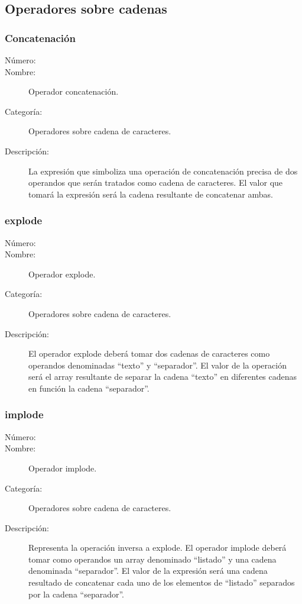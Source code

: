 \subsection{Operadores sobre cadenas}

\subsubsection{Concatenación}
\begin{framed}
	\begin{description}
		\item [Número:] \cn
		\item [Nombre:] Operador concatenación.
		\item [Categoría:] Operadores sobre cadena de caracteres.
		\item [Descripción:] La expresión que simboliza una operación de concatenación precisa de dos operandos que serán
		tratados como cadena de caracteres. El valor que tomará la expresión será la cadena resultante de concatenar ambas.
	\end {description}
\end{framed}

\subsubsection{explode}
\begin{framed}
	\begin{description}
		\item [Número:] \cn
		\item [Nombre:] Operador explode.
		\item [Categoría:] Operadores sobre cadena de caracteres.
		\item [Descripción:] El operador explode deberá tomar dos cadenas de caracteres como operandos denominadas ``texto'' y ``separador''.
		El valor de la operación será el array resultante de separar la cadena ``texto'' en diferentes cadenas en función la cadena ``separador''.
	\end {description}
\end{framed}

\subsubsection{implode}
\begin{framed}
	\begin{description}
		\item [Número:] \cn
		\item [Nombre:] Operador implode.
		\item [Categoría:] Operadores sobre cadena de caracteres.
		\item [Descripción:] Representa la operación inversa a explode. El operador implode deberá tomar como operandos un array denominado
		``listado'' y una cadena denominada ``separador''. El valor de la expresión será una cadena resultado de concatenar cada uno
		de los elementos de ``listado'' separados por la cadena ``separador''.
	\end {description}
\end{framed}

